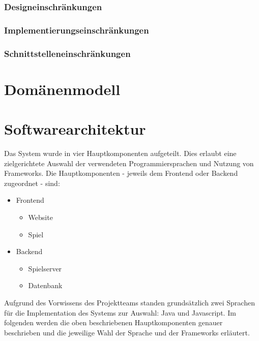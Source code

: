 \documentclass[11pt,ngerman]{article}
\begin{document}
    \subsubsection{Designeinschränkungen}

    \subsubsection{Implementierungseinschränkungen}

    \subsubsection{Schnittstelleneinschränkungen}

    \section{Domänenmodell}

    \section{Softwarearchitektur}
        Das System wurde in vier Hauptkomponenten aufgeteilt. Dies erlaubt eine zielgerichtete Auswahl der verwendeten Programmiersprachen und Nutzung von Frameworks. Die Hauptkomponenten - jeweils dem Frontend oder Backend zugeordnet - sind:
        \begin{itemize}
            \item Frontend
            \begin{itemize}
                \item Website
                \item Spiel
            \end{itemize}
            \item Backend
            \begin{itemize}
                \item Spielserver
                \item Datenbank
            \end{itemize}
        \end{itemize}

        Aufgrund des Vorwissens des Projektteams standen grundsätzlich zwei Sprachen für die Implementation des Systems zur Auswahl: Java und Javascript. Im folgenden werden die oben beschriebenen Hauptkomponenten genauer beschrieben und die jeweilige Wahl der Sprache und der Frameworks erläutert.
\end{document}
